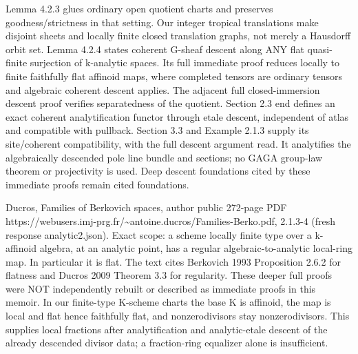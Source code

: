\documentclass[11pt]{article}
\begin{document}
Lemma 4.2.3 glues ordinary open quotient charts and preserves goodness/strictness in that setting. Our integer tropical translations make disjoint sheets and locally finite closed translation graphs, not merely a Hausdorff orbit set. Lemma 4.2.4 states coherent G-sheaf descent along ANY flat quasi-finite surjection of k-analytic spaces. Its full immediate proof reduces locally to finite faithfully flat affinoid maps, where completed tensors are ordinary tensors and algebraic coherent descent applies. The adjacent full closed-immersion descent proof verifies separatedness of the quotient. Section 2.3 end defines an exact coherent analytification functor through etale descent, independent of atlas and compatible with pullback. Section 3.3 and Example 2.1.3 supply its site/coherent compatibility, with the full descent argument read. It analytifies the algebraically descended pole line bundle and sections; no GAGA group-law theorem or projectivity is used. Deep descent foundations cited by these immediate proofs remain cited foundations.

Ducros, Families of Berkovich spaces, author public 272-page PDF https://webusers.imj-prg.fr/\textasciitilde{}antoine.ducros/Families-Berko.pdf, 2.1.3-4 (fresh response analytic2.json). Exact scope: a scheme locally finite type over a k-affinoid algebra, at an analytic point, has a regular algebraic-to-analytic local-ring map. In particular it is flat. The text cites Berkovich 1993 Proposition 2.6.2 for flatness and Ducros 2009 Theorem 3.3 for regularity. These deeper full proofs were NOT independently rebuilt or described as immediate proofs in this memoir. In our finite-type K-scheme charts the base K is affinoid, the map is local and flat hence faithfully flat, and nonzerodivisors stay nonzerodivisors. This supplies local fractions after analytification and analytic-etale descent of the already descended divisor data; a fraction-ring equalizer alone is insufficient.
\end{document}
